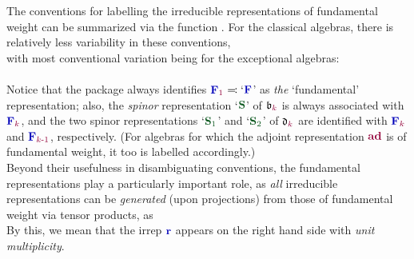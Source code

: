 \documentclass[12pt,a4paper]{article}\let\ifpdf\relax
\begin{document}
The conventions for labelling the irreducible representations of fundamental weight can be summarized via the function . For the classical algebras, there is relatively less variability in these conventions,
%
~\\[-4pt]
%
with most conventional variation being for the exceptional algebras:
%
~\\[-4pt]
%
\newpage
%
~\\[-4pt]
%



Notice that the package always identifies $\mathbf{\b{F}}_{\r{1}}\equivL$`$\mathbf{\b{F}}$' as \emph{the} `fundamental' representation; also, the \emph{spinor} representation `$\mathbf{\g{S}}$' of $\mathfrak{b}_{\r{k}}$ is always associated with $\mathbf{\b{F}}_{\r{k}}$, and the two spinor representations `$\mathbf{\g{S}}_{\g{1}}$' and `$\mathbf{\g{S}}_{\g{2}}$' of $\mathfrak{d}_{\r{k}}$ are identified with $\mathbf{\b{F}}_{\r{k}}$ and $\mathbf{\b{F}}_{\r{k\text{-}1}}$, respectively. (For algebras for which the adjoint representation $\mathbf{\r{ad}}$ is of fundamental weight, it too is labelled accordingly.)\\[-10pt]

Beyond their usefulness in disambiguating conventions, the fundamental representations play a particularly important role, as \emph{all} irreducible representations can be \emph{generated} (upon projections) from those of fundamental weight via tensor products, as\\[-12pt]
%
%
By this, we mean that the irrep $\mathbf{\b{r}}$ appears on the right hand side with \emph{unit multiplicity}.\\[-10pt]
\end{document}
